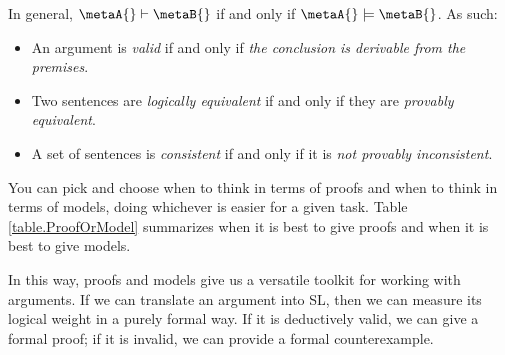 In general, $\metaA{}\vdash\metaB{}$ if and only if $\metaA{}\models\metaB{}$. As such:
\begin{itemize}
\item An argument is \emph{valid} if and only if \emph{the conclusion is derivable from the premises}.
\item Two sentences are \emph{logically equivalent} if and only if they are \emph{provably equivalent}.
\item A set of sentences is \emph{consistent} if and only if it is \emph{not provably inconsistent}.
\end{itemize}
You can pick and choose when to think in terms of proofs and when to think in terms of models, doing whichever is easier for a given task. Table \ref{table.ProofOrModel} summarizes when it is best to give proofs and when it is best to give models.

In this way, proofs and models give us a versatile toolkit for working with arguments. If we can translate an argument into SL, then we can measure its logical weight in a purely formal way. If it is deductively valid, we can give a formal proof; if it is invalid, we can provide a formal counterexample.

